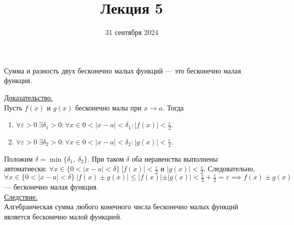 \documentclass{article}
\title{Лекция 5}
\author{}
\date{31 сентября 2024}
\begin{document}
\maketitle

\begin{theorem}
    Сумма и разность двух бесконечно малых функций --- это бесконечно малая функция.
\end{theorem}
\noindent
\underline{Доказательство.}\\[0.1cm]
Пусть \(f(x)\) и \(g(x)\) бесконечно малы при \(x \to a\). Тогда
\begin{enumerate}
    \item \(\displaystyle \forall \varepsilon > 0\ \exists \delta_{1} > 0 : \forall x \in 0 < \vert x - a \vert < \delta_{1}: \vert f(x) \vert < \frac{\varepsilon}{2}\). 
    \item \(\displaystyle \forall \varepsilon > 0\ \exists \delta_{2} > 0 : \forall x \in 0 < \vert x - a \vert < \delta_{2}: \vert g(x) \vert < \frac{\varepsilon}{2}\). 
\end{enumerate}
\noindent
Положим \(\delta = \min\{\delta_{1},\ \delta_{2}\}\). При таком \(\delta \) оба неравенства выполнены автоматиески: \(\displaystyle \forall x \in \{0 < \vert x - a \vert < \delta\}\ \vert f(x) \vert < \frac{\varepsilon}{2}\) и \(\displaystyle \vert g(x) \vert < \frac{\varepsilon}{2}\). 
Следовательно, \(\displaystyle \forall x \in \{0 < \vert x - a \vert < \delta\}\ \vert f(x) \pm g(x) \vert \leq \vert f(x) \vert \pm \vert g(x) \vert < \frac{\varepsilon}{2} + \frac{\varepsilon}{2} = \varepsilon \implies f(x) \pm g(x)\) --- бесконечно малая функция.\\[0.1cm]
\underline{Следствие.}\\[0.1cm]
Алгебраическая сумма любого конечного числа бесконечно малых функций является бесконечно малой функцией.
\end{document}
